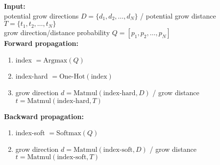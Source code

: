 \textbf{Input:} \\
potential grow directions $D = \{d_1, d_2, \dots, d_N\}$ / potential grow distance $T = \{t_1, t_2, \dots, t_N\}$ \\
grow direction/distance probability $Q = [p_1, p_2, \dots, p_N]$ \\
\textbf{Forward propagation:}
\vspace*{-0.75em}
\begin{enumerate}[itemsep=-2pt]
    \item index $= \text{Argmax}(Q)$
    \item index-hard $= \text{One-Hot}(\text{index})$
    \item grow direction $d = \text{Matmul}(\text{index-hard}, D)$ / grow distance $t = \text{Matmul}(\text{index-hard}, T)$
\end{enumerate}
\vspace*{-0.75em}
\textbf{Backward propagation:}
\vspace*{-0.75em}
\begin{enumerate}[itemsep=-2pt]
    \item index-soft $= \text{Softmax}(Q)$
    \item grow direction $d = \text{Matmul}(\text{index-soft}, D)$ / grow distance $t = \text{Matmul}(\text{index-soft}, T)$
\end{enumerate}